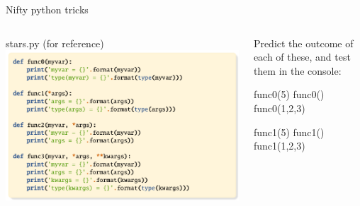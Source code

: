 \documentclass[aspectratio=149, handout] {beamer}
\begin{document}
\begin{frame}[fragile,t]{ Nifty python tricks}

  \begin{columns}
    \begin{column}[t]{.48\textwidth}
      stars.py (for reference)
      \includegraphics[scale=.85, trim= 0 0 7cm 0, clip]{stars.pdf}
    \end{column}
   
    \begin{column}[t]{.48\textwidth}
      Predict the outcome of each of these, 
      and test them in the console:
      \begin{pythoncode}
        func0(5)
        func0()
        func0(1,2,3)	
      \end{pythoncode}
  
      \pause
      \begin{pythoncode}
        func1(5)
        func1()
        func1(1,2,3)	
      \end{pythoncode}
    \end{column}
  \end{columns}

\end{frame}
\end{document}
